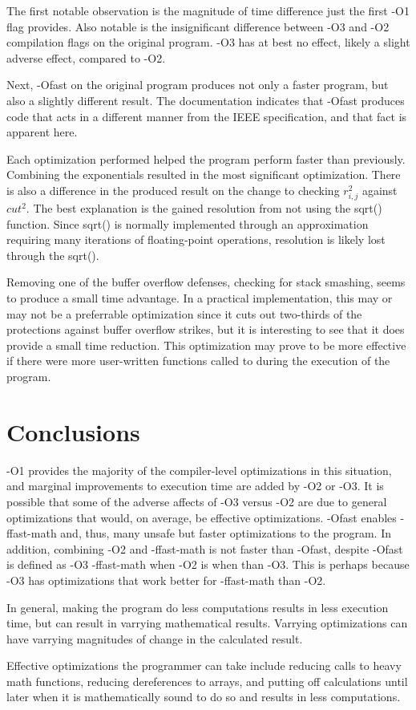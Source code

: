 \documentclass[12pt]{article}
\begin{document}
	The first notable observation is the magnitude of time difference just the first -O1 flag provides. 
	Also notable is the insignificant difference between -O3 and -O2 compilation flags on the original program.
	-O3 has at best no effect, likely a slight adverse effect, compared to -O2. 

	Next, -Ofast on the original program produces not only a faster program, but also a slightly different result.
	The documentation indicates that -Ofast produces code that acts in a different manner from the IEEE specification, and that fact is apparent here.

	Each optimization performed helped the program perform faster than previously. Combining the exponentials resulted in the most significant optimization.
	There is also a difference in the produced result on the change to checking $r_{i,j}^2$ against $cut^2$.
	The best explanation is the gained resolution from not using the sqrt() function.
	Since sqrt() is normally implemented through an approximation requiring many iterations of floating-point operations,
	resolution is likely lost through the sqrt().

	Removing one of the buffer overflow defenses, checking for stack smashing, seems to produce a small time advantage.
	In a practical implementation, this may or may not be a preferrable optimization 
	since it cuts out two-thirds of the protections against buffer overflow strikes, but it is interesting to see that it does provide a small time reduction.
	This optimization may prove to be more effective if there were more user-written functions called to during the execution of the program.

	\section{Conclusions}

	-O1 provides the majority of the compiler-level optimizations in this situation, and marginal improvements to execution time are added by -O2 or -O3.
	It is possible that some of the adverse affects of -O3 versus -O2 are due to general optimizations that would, on average, be effective optimizations.
	-Ofast enables -ffast-math and, thus, many unsafe but faster optimizations to the program.
	In addition, combining -O2 and -ffast-math is not faster than -Ofast, despite -Ofast is defined as -O3 -ffast-math when -O2 is when than -O3.
	This is perhaps because -O3 has optimizations that work better for -ffast-math than -O2.

	In general, making the program do less computations results in less execution time, but can result in varrying mathematical results.
	Varrying optimizations can have varrying magnitudes of change in the calculated result.

	Effective optimizations the programmer can take include reducing calls to heavy math functions, reducing dereferences to arrays, and putting off calculations until later when it is mathematically sound to do so and results in less computations.
\end{document}
